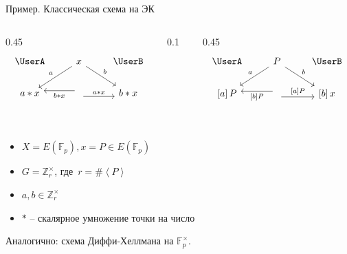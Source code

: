 \documentclass{beamer}
\begin{document}
\begin{frame}[fragile]{Пример. Классическая схема на ЭК}
	\begin{columns}
		\begin{column}{0.45\textwidth}
			\[
			\begin{tikzcd}
				\text{\UserA} &\arrow{ld}[swap]{a} x  \arrow{rd}{b} & \text{\UserB} \\
				a * x &
				\arrow[yshift=-0.7ex]{r}{a * x}
				\arrow[yshift=0.7ex]{l}{b * x}
				& b * x\\
			\end{tikzcd}
			\]
		\end{column}
		\begin{column}{0.1\textwidth}
			\structure{$\Rightarrow$}
		\end{column}
		\begin{column}{0.45\textwidth}
			\[
			\begin{tikzcd}
				\text{\UserA} &\arrow{ld}[swap]{a} P \arrow{rd}{b} & \text{\UserB} \\
				\left[a\right] P &
				\arrow[yshift=-0.7ex]{r}{\left[a\right] P}
				\arrow[yshift=0.7ex]{l}{\left[b\right] P}
				& \left[ b \right] x\\
			\end{tikzcd}
			\]
		\end{column}
	\end{columns}
	\vspace{-0.5em}
	\begin{itemize}
		\item $X = E(\mathbb{F}_p), x = P \in E(\mathbb{F}_p)$
		\item $G = \mathbb{Z}_r^\times$, где~$r = \#\left<P\right>$
		\item $a, b \in \mathbb{Z}_r^\times$
		\item $*$ -- скалярное умножение точки на число
	\end{itemize}
	
	\vspace{1em}
	Аналогично: схема Диффи-Хеллмана на $\mathbb{F}_p^\times$.
\end{frame}
\end{document}
